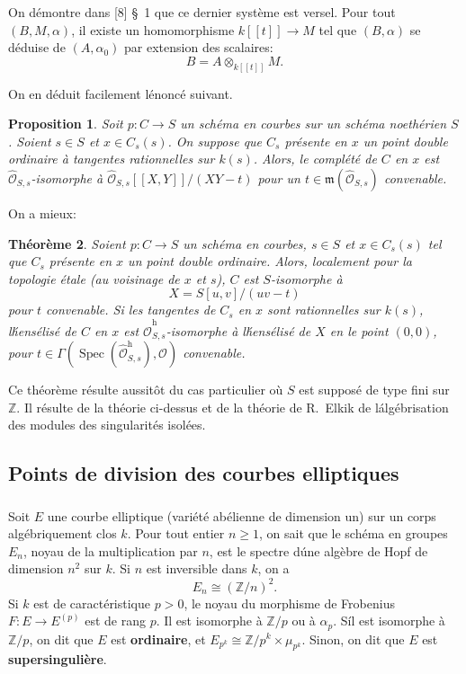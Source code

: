 \documentclass{amsart}
\theoremstyle{plain}
\newtheorem{theorem}{Th\'eor\`eme}[section]
\newtheorem{proposition}[theorem]{Proposition}
\theoremstyle{remark}
\DeclareMathOperator{\Spec}{Spec}
\newcommand{\cO}{\mathcal{O}}
\newcommand{\bbZ}{\mathbb{Z}}
\begin{document}
On d\'emontre dans [8] \S~1 que ce dernier syst\`eme est versel. Pour tout
$(B, M, \alpha)$, il existe un homomorphisme $k[[t]] \to M$ tel que $(B, \alpha)$ se
d\'eduise de $(A, \alpha_0)$ par extension des scalaires:
\[
B = A \otimes_{k[[t]]} M.
\]

On en d\'eduit facilement l\'enonc\'e suivant.

\begin{proposition}
Soit $p: C \to S$ un sch\'ema en courbes sur un sch\'ema noeth\'erien $S$. Soient
$s \in S$ et $x \in C_s(s)$. On suppose que $C_s$ pr\'esente en $x$ un point double
ordinaire \`a tangentes rationnelles sur $k(s)$. Alors, le compl\'et\'e de $C$ en $x$ est
$\widehat{\cO}_{S,s}$-isomorphe \`a $\widehat{\cO}_{S,s}[[X,Y]]/(XY-t)$ pour un
$t \in \mathfrak{m}(\widehat{\cO}_{S,s})$ convenable.
\end{proposition}

On a mieux:

\begin{theorem}
Soient $p: C \to S$ un sch\'ema en courbes, $s \in S$ et $x \in C_s(s)$ tel que
$C_s$ pr\'esente en $x$ un point double ordinaire. Alors, localement pour la topologie
\'etale (au voisinage de $x$ et $s$), $C$ est $S$-isomorphe \`a
\[
X = S[u,v]/(uv-t)
\]
pour $t$ convenable. Si les tangentes de $C_s$ en $x$ sont rationnelles sur $k(s)$,
l\'hens\'elis\'e de $C$ en $x$ est $\widehat{\cO}_{S,s}^{\text{h}}$-isomorphe \`a l\'hens\'elis\'e de
$X$ en le point $(0,0)$, pour $t \in \Gamma(\Spec(\widehat{\cO}_{S,s}^{\text{h}}), \cO)$ convenable.
\end{theorem}

Ce th\'eor\`eme r\'esulte aussit\^ot du cas particulier o\`u $S$ est suppos\'e de type fini
sur $\bbZ$. Il r\'esulte de la th\'eorie ci-dessus et de la th\'eorie de R.~Elkik de
l\'alg\'ebrisation des modules des singularit\'es isol\'ees.

\subsection{Points de division des courbes elliptiques}

\subsubsection{}
Soit $E$ une courbe elliptique (vari\'et\'e ab\'elienne de dimension un) sur un corps
alg\'ebriquement clos $k$. Pour tout entier $n \geq 1$, on sait que le sch\'ema en groupes
$E_n$, noyau de la multiplication par $n$, est le spectre d\'une alg\`ebre de Hopf de
dimension $n^2$ sur $k$. Si $n$ est inversible dans $k$, on a
\[
E_n \cong (\bbZ/n)^2.
\]
Si $k$ est de caract\'eristique $p > 0$, le noyau du morphisme de Frobenius
$F: E \to E^{(p)}$ est de rang $p$. Il est isomorphe \`a $\bbZ/p$ ou \`a $\alpha_p$. S\'il est
isomorphe \`a $\bbZ/p$, on dit que $E$ est \textbf{ordinaire}, et
$E_{p^k} \cong \bbZ/p^k \times \mu_{p^k}$. Sinon, on dit que $E$ est
\textbf{supersinguli\`ere}.
\end{document}
